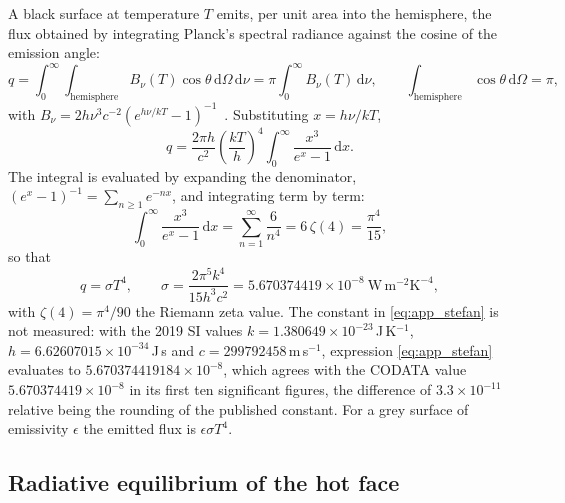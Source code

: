 A black surface at temperature $T$ emits, per unit area into the hemisphere, the flux obtained by integrating Planck's spectral radiance against the cosine of the emission angle:
\begin{equation}
    q = \int_0^\infty\!\!\int_{\mathrm{hemisphere}} B_\nu(T)\cos\theta\,\mathrm{d}\Omega\,\mathrm{d}\nu
    = \pi\int_0^\infty B_\nu(T)\,\mathrm{d}\nu ,
    \qquad
    \int_{\mathrm{hemisphere}}\cos\theta\,\mathrm{d}\Omega = \pi ,
    \label{eq:app_planck_setup}
\end{equation}
with $B_\nu = 2h\nu^3c^{-2}\left(e^{h\nu/kT}-1\right)^{-1}$~\cite{planck1901}. Substituting $x = h\nu/kT$,
\begin{equation}
    q = \frac{2\pi h}{c^2}\left(\frac{kT}{h}\right)^{4}\int_0^\infty\frac{x^3}{e^x-1}\,\mathrm{d}x .
    \label{eq:app_planck_integral}
\end{equation}
The integral is evaluated by expanding the denominator, $\left(e^x-1\right)^{-1} = \sum_{n\ge1}e^{-nx}$, and integrating term by term:
\begin{equation}
    \int_0^\infty\frac{x^3}{e^x-1}\,\mathrm{d}x = \sum_{n=1}^{\infty}\frac{6}{n^4} = 6\,\zeta(4) = \frac{\pi^4}{15} ,
    \label{eq:app_zeta4}
\end{equation}
so that
\begin{equation}
    q = \sigma T^4 ,
    \qquad
    \sigma = \frac{2\pi^5k^4}{15h^3c^2} = 5.670374419\times10^{-8}\ \mathrm{W\,m^{-2}K^{-4}} ,
    \label{eq:app_stefan}
\end{equation}
with $\zeta(4) = \pi^4/90$ the Riemann zeta value. The constant in \eqref{eq:app_stefan} is not measured: with the 2019 SI values $k = 1.380649\times10^{-23}$\,J\,K$^{-1}$, $h = 6.62607015\times10^{-34}$\,J\,s and $c = 299792458$\,m\,s$^{-1}$, expression \eqref{eq:app_stefan} evaluates to $5.670374419184\times10^{-8}$, which agrees with the CODATA value $5.670374419\times10^{-8}$ in its first ten significant figures, the difference of $3.3\times10^{-11}$ relative being the rounding of the published constant. For a grey surface of emissivity $\epsilon$ the emitted flux is $\epsilon\sigma T^4$.

\subsection{Radiative equilibrium of the hot face}


